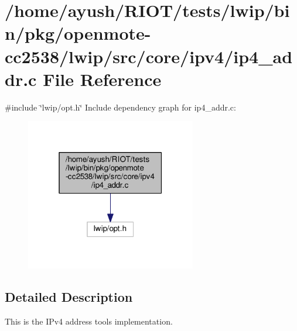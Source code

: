 \hypertarget{openmote-cc2538_2lwip_2src_2core_2ipv4_2ip4__addr_8c}{}\section{/home/ayush/\+R\+I\+O\+T/tests/lwip/bin/pkg/openmote-\/cc2538/lwip/src/core/ipv4/ip4\+\_\+addr.c File Reference}
\label{openmote-cc2538_2lwip_2src_2core_2ipv4_2ip4__addr_8c}
{\ttfamily \#include \char`\"{}lwip/opt.\+h\char`\"{}}\newline
Include dependency graph for ip4\+\_\+addr.\+c\+:
\nopagebreak
\begin{figure}[H]
\begin{center}
\leavevmode
\includegraphics[width=211pt]{openmote-cc2538_2lwip_2src_2core_2ipv4_2ip4__addr_8c__incl}
\end{center}
\end{figure}


\subsection{Detailed Description}
This is the I\+Pv4 address tools implementation. 